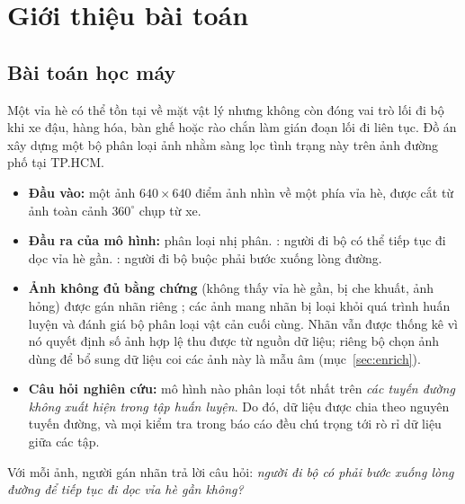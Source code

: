 \section{Giới thiệu bài toán}

\subsection{Bài toán học máy}

Một vỉa hè có thể tồn tại về mặt vật lý nhưng không còn đóng vai trò lối đi bộ khi xe đậu, hàng hóa, bàn ghế hoặc rào chắn làm gián đoạn lối đi liên tục. Đồ án xây dựng một bộ phân loại ảnh nhằm sàng lọc tình trạng này trên ảnh đường phố tại TP.HCM.

\begin{itemize}
  \item \textbf{Đầu vào:} một ảnh $640\times640$ điểm ảnh nhìn về một phía vỉa hè, được cắt từ ảnh toàn cảnh $360^\circ$ chụp từ xe.
  \item \textbf{Đầu ra của mô hình:} phân loại nhị phân. : người đi bộ có thể tiếp tục đi dọc vỉa hè gần. : người đi bộ buộc phải bước xuống lòng đường.
  \item \textbf{Ảnh không đủ bằng chứng} (không thấy vỉa hè gần, bị che khuất, ảnh hỏng) được gán nhãn riêng ; các ảnh mang nhãn  bị loại khỏi quá trình huấn luyện và đánh giá bộ phân loại vật cản cuối cùng. Nhãn  vẫn được thống kê vì nó quyết định số ảnh hợp lệ thu được từ nguồn dữ liệu; riêng bộ chọn ảnh dùng để bổ sung dữ liệu coi các ảnh này là mẫu âm (mục~\ref{sec:enrich}).
  \item \textbf{Câu hỏi nghiên cứu:} mô hình nào phân loại tốt nhất trên \emph{các tuyến đường không xuất hiện trong tập huấn luyện}. Do đó, dữ liệu được chia theo nguyên tuyến đường, và mọi kiểm tra trong báo cáo đều chú trọng tới rò rỉ dữ liệu giữa các tập.
\end{itemize}

Với mỗi ảnh, người gán nhãn trả lời câu hỏi: \emph{người đi bộ có phải bước xuống lòng đường để tiếp tục đi dọc vỉa hè gần không?}

